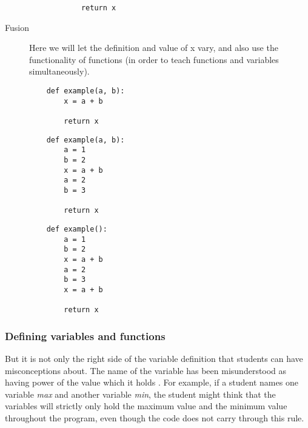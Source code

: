 \begin{description}
\begin{minipage}[t]{0.45\columnwidth}
\begin{verbatim}
            return x
  \end{verbatim}
\end{minipage}
\newline

    \item [Fusion] Here we will let the definition and value of x vary, 
and also use the functionality of functions (in order to teach 
functions and variables simultaneously). 

\hfill
\begin{minipage}[t]{0.3\columnwidth}
  \begin{verbatim}
    def example(a, b):
        x = a + b

        return x
  \end{verbatim}
\end{minipage}
\hfill
\begin{minipage}[t]{0.3\columnwidth}
  \begin{verbatim}
    def example(a, b):
        a = 1
        b = 2
        x = a + b
        a = 2
        b = 3

        return x
  \end{verbatim}
\end{minipage}
\hfill
\begin{minipage}[t]{0.3\columnwidth}
  \begin{verbatim}
    def example():
        a = 1
        b = 2
        x = a + b
        a = 2
        b = 3
        x = a + b

        return x
  \end{verbatim}
\end{minipage}
    
\end{description}



\subsubsection{Defining variables and functions}

But it is not only the right side of the variable definition that students 
can 
have misconceptions about. The name of the variable has been misunderstood 
as 
having power of the value which it holds 
\parencite{MisconceptionsSurvey2017,Sleeman1984}. For example, if a student 
names one variable \emph{max} and another variable \emph{min}, the student 
might think that the variables will strictly only hold the maximum value 
and 
the minimum value throughout the program, even though the code does not 
carry through this rule. 

